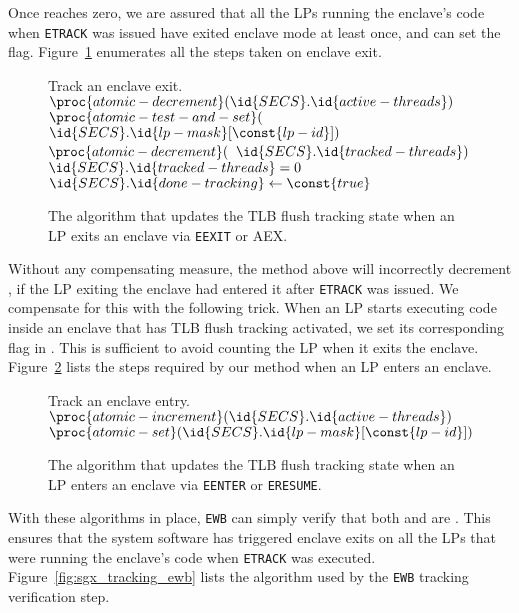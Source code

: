 Once  reaches zero, we are assured that all the LPs running
the enclave's code when \texttt{ETRACK} was issued have exited enclave mode at
least once, and can set the  flag.
Figure~\ref{fig:sgx_tracking_eexit} enumerates all the steps taken on enclave
exit.

\begin{figure}[hbt]
  \begin{codebox}
  \zi \Comment Track an enclave exit.
  \li $\proc{atomic-decrement}(\id{SECS}.\id{active-threads})$
  \li \If $\proc{atomic-test-and-set}($
        \Indentmore
  \zi     $\id{SECS}.\id{lp-mask}[\const{lp-id}])$
        \End
  \li   \Then $\proc{atomic-decrement}($
          \Indentmore
  \zi     $\id{SECS}.\id{tracked-threads})$
          \End
  \li   \If $\id{SECS}.\id{tracked-threads} = 0$
  \li     \Then $\id{SECS}.\id{done-tracking} \gets \const{true}$
          \End
        \End
  \end{codebox}
  \caption{
    The algorithm that updates the TLB flush tracking state when an LP exits an
    enclave via \texttt{EEXIT} or AEX.
  }
  \label{fig:sgx_tracking_eexit}
\end{figure}

Without any compensating measure, the method above will incorrectly decrement
, if the LP exiting the enclave had entered it after
\texttt{ETRACK} was issued. We compensate for this with the following trick.
When an LP starts executing code inside an enclave that has TLB flush tracking
activated, we set its corresponding flag in . This is sufficient to
avoid counting the LP when it exits the enclave.
Figure~\ref{fig:sgx_tracking_eenter} lists the steps required by our method
when an LP enters an enclave.

\begin{figure}[hbt]
  \begin{codebox}
  \zi \Comment Track an enclave entry.
  \li $\proc{atomic-increment}(\id{SECS}.\id{active-threads})$
  \li $\proc{atomic-set}(\id{SECS}.\id{lp-mask}[\const{lp-id}])$
  \end{codebox}
  \caption{
    The algorithm that updates the TLB flush tracking state when an LP enters
    an enclave via \texttt{EENTER} or \texttt{ERESUME}.
  }
  \label{fig:sgx_tracking_eenter}
\end{figure}

With these algorithms in place, \texttt{EWB} can simply verify that both
 and  are . This ensures that the
system software has triggered enclave exits on all the LPs that were running
the enclave's code when \texttt{ETRACK} was executed.
Figure~\ref{fig:sgx_tracking_ewb} lists the algorithm used by the \texttt{EWB}
tracking verification step.

